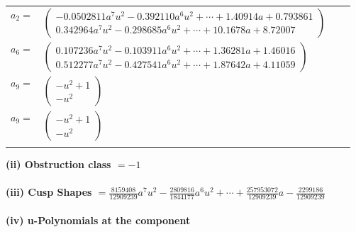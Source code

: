 \documentclass[1p]{elsarticle_modified}
\theoremstyle{definition}
\begin{document}
\begin{tabular}{m{7pt} m{180pt} m{7pt} m{180pt} }
\flushright $a_{2}=$&$\begin{pmatrix}-0.0502811 a^{7} u^{2}-0.392110 a^{6} u^{2}+\cdots+1.40914 a+0.793861\\0.342964 a^{7} u^{2}-0.298685 a^{6} u^{2}+\cdots+10.1678 a+8.72007\end{pmatrix}$ \\
\flushright $a_{6}=$&$\begin{pmatrix}0.107236 a^{7} u^{2}-0.103911 a^{6} u^{2}+\cdots+1.36281 a+1.46016\\0.512277 a^{7} u^{2}-0.427541 a^{6} u^{2}+\cdots+1.87642 a+4.11059\end{pmatrix}$ \\
\flushright $a_{9}=$&$\begin{pmatrix}- u^2+1\\- u^2\end{pmatrix}$\\ \flushright $a_{9}=$&$\begin{pmatrix}- u^2+1\\- u^2\end{pmatrix}$\\&\end{tabular}
\flushleft \textbf{(ii) Obstruction class $= -1$}\\~\\
\flushleft \textbf{(iii) Cusp Shapes $= \frac{8159408}{12909239} a^7 u^2-\frac{2809816}{1844177} a^6 u^2+\cdots+\frac{257953072}{12909239} a-\frac{2299186}{12909239}$}\\~\\
\newpage\renewcommand{\arraystretch}{1}
\flushleft \textbf{(iv) u-Polynomials at the component}\newline \\
\end{document}
